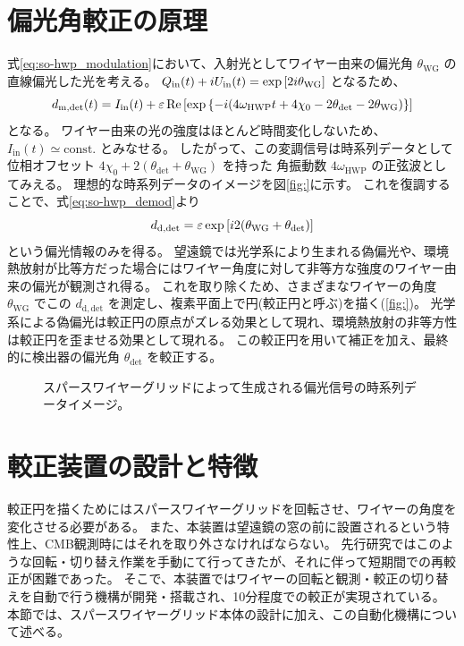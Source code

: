 \documentclass[../../main.tex]{subfiles}
\begin{document}
\section{偏光角較正の原理}
式\eqref{eq:so-hwp_modulation}において、入射光としてワイヤー由来の偏光角 $\theta_{\mathrm{WG}}$ の直線偏光した光を考える。
$Q_{\mathrm{in}}(t) + iU_{\mathrm{in}}(t) = \exp\qty[2i\theta_{\mathrm{WG}}]$ となるため、
\begin{equation}
    d_{\mathrm{m}, \mathrm{det}}(t) = I_{\mathrm{in}}(t) + \varepsilon\Re\qty[\exp\qty{-i \qty(4\omega_{\mathrm{HWP}}t + 4\chi_0 - 2\theta_{\mathrm{det}} - 2\theta_{\mathrm{WG}})}]
\end{equation}
となる。
ワイヤー由来の光の強度はほとんど時間変化しないため、$I_{\mathrm{in}}(t) \simeq \mathrm{const.}$ とみなせる。
したがって、この変調信号は時系列データとして位相オフセット $4\chi_0 + 2(\theta_{\mathrm{det}} + \theta_{\mathrm{WG}})$ を持った
角振動数 $4\omega_{\mathrm{HWP}}$ の正弦波としてみえる。
理想的な時系列データのイメージを図\ref{fig:}に示す。
これを復調することで、式\eqref{eq:so-hwp_demod}より
\begin{equation}
    d_{\mathrm{d, det}} = \varepsilon\exp\qty[i2\qty(\theta_{\mathrm{WG}} + \theta_{\mathrm{det}})]
\end{equation}
という偏光情報のみを得る。
望遠鏡では光学系により生まれる偽偏光や、環境熱放射が比等方だった場合にはワイヤー角度に対して非等方な強度のワイヤー由来の偏光が観測され得る。
これを取り除くため、さまざまなワイヤーの角度 $\theta_{\mathrm{WG}}$ でこの $d_{\mathrm{d, det}}$ を測定し、複素平面上で円(較正円と呼ぶ)を描く(\ref{fig:})。
光学系による偽偏光は較正円の原点がズレる効果として現れ、環境熱放射の非等方性は較正円を歪ませる効果として現れる。
この較正円を用いて補正を加え、最終的に検出器の偏光角 $\theta_{\mathrm{det}}$ を較正する。
\begin{figure}
    \centering
    \caption[スパースワイヤーグリッドによって生成される偏光信号の時系列データイメージ]{スパースワイヤーグリッドによって生成される偏光信号の時系列データイメージ。}
\end{figure}
\section{較正装置の設計と特徴}
較正円を描くためにはスパースワイヤーグリッドを回転させ、ワイヤーの角度を変化させる必要がある。
また、本装置は望遠鏡の窓の前に設置されるという特性上、CMB観測時にはそれを取り外さなければならない。
先行研究ではこのような回転・切り替え作業を手動にて行ってきたが、それに伴って短期間での再較正が困難であった。
そこで、本装置ではワイヤーの回転と観測・較正の切り替えを自動で行う機構が開発・搭載され、10分程度での較正が実現されている。
本節では、スパースワイヤーグリッド本体の設計に加え、この自動化機構について述べる。
\end{document}
